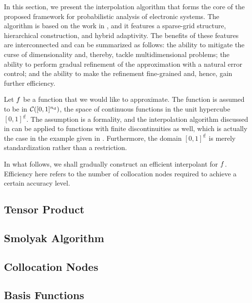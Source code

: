 In this section, we present the interpolation algorithm that forms the core of
the proposed framework for probabilistic analysis of electronic systems. The
algorithm is based on the work in \cite{jakeman2012, klimke2006, ma2009}, and it
features a sparse-grid structure, hierarchical construction, and hybrid
adaptivity. The benefits of these features are interconnected and can be
summarized as follows: the ability to mitigate the curse of dimensionality and,
thereby, tackle multidimensional problems; the ability to perform gradual
refinement of the approximation with a natural error control; and the ability to
make the refinement fine-grained and, hence, gain further efficiency.

Let $f$ be a function that we would like to approximate. The function is
assumed to be in $\mathcal{C}([0, 1]^{n_\text{d}})$, the space of continuous functions
in the unit hypercube $[0, 1]^\nin$. The assumption is a formality, and the
interpolation algorithm discussed in  can be applied to
functions with finite discontinuities as well, which is actually the case in the
example given in . Furthermore, the domain $[0, 1]^\nin$ is
merely standardization rather than a restriction.

In what follows, we shall gradually construct an efficient interpolant for $f$.
Efficiency here refers to the number of collocation nodes required to achieve a
certain accuracy level.

\subsection{Tensor Product} 


\subsection{Smolyak Algorithm} 


\subsection{Collocation Nodes} 


\subsection{Basis Functions} 


